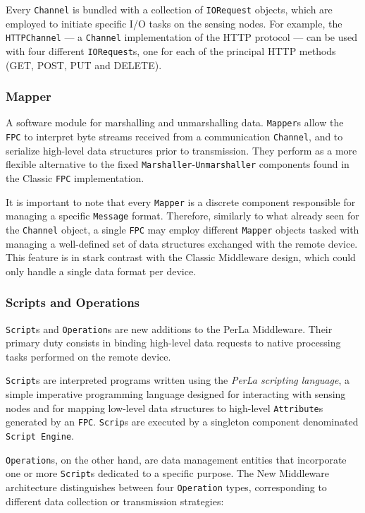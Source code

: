 Every \texttt{Channel} is bundled with a collection of \texttt{IORequest}
objects, which are employed to initiate specific I/O tasks on the sensing
nodes. For example, the \texttt{HTTPChannel} --- a \texttt{Channel}
implementation of the HTTP protocol --- can be used with four different
\texttt{IORequest}s, one for each of the principal HTTP methods (GET, POST, PUT
and DELETE).

\subsubsection{Mapper}

A software module for marshalling and unmarshalling data. \texttt{Mapper}s
allow the \texttt{FPC} to interpret byte streams received from a communication
\texttt{Channel}, and to serialize high-level data structures prior to
transmission. They perform as a more flexible alternative to the fixed
\texttt{Marshaller}-\texttt{Unmarshaller} components found in the Classic
\texttt{FPC} implementation.

It is important to note that every \texttt{Mapper} is a discrete component
responsible for managing a specific \texttt{Message} format. Therefore,
similarly to what already seen for the \texttt{Channel} object, a single
\texttt{FPC} may employ different \texttt{Mapper} objects tasked with managing
a well-defined set of data structures exchanged with the remote device. This
feature is in stark contrast with the Classic Middleware design, which could
only handle a single data format per device.

\subsubsection{Scripts and Operations}

\texttt{Script}s and \texttt{Operation}s are new additions to the PerLa
Middleware. Their primary duty consists in binding high-level data requests to
native processing tasks performed on the remote device.

\texttt{Script}s are interpreted programs written using the \textit{PerLa
scripting language}, a simple imperative programming language designed for
interacting with sensing nodes and for mapping low-level data structures to
high-level \texttt{Attribute}s generated by an \texttt{FPC}. \texttt{Scrip}s
are executed by a singleton component denominated \texttt{Script Engine}.

\texttt{Operation}s, on the other hand, are data management entities that
incorporate one or more \texttt{Script}s dedicated to a specific purpose. The
New Middleware architecture distinguishes between four \texttt{Operation}
types, corresponding to different data collection or transmission strategies:

